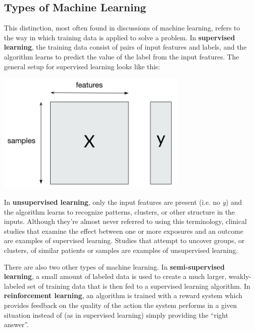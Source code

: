 \subsection{Types of Machine Learning}

This distinction, most often found in discussions of machine learning, refers to the way in which training data is applied to solve a problem. In \textbf{supervised learning}, the training data consist of pairs of input features and labels, and the algorithm learns to predict the value of the label from the input features. The general setup for supervised learning looks like this:
\begin{center}
\includegraphics[width=0.7\textwidth]{img/supervised-learning.png}
\end{center}

In \textbf{unsupervised learning}, only the input features are present (i.e. no \emph{y}) and the algorithm learns to recognize patterns, clusters, or other structure in the inputs. Although they're almost never referred to using this terminology, clinical studies that examine the effect between one or more exposures and an outcome are examples of supervised learning. Studies that attempt to uncover groups, or clusters, of similar patients or samples are examples of unsupervised learning.

There are also two other types of machine learning. In \textbf{semi-supervised learning}, a small amount of labeled data is used to create a much larger, weakly-labeled set of training data that is then fed to a supervised learning algorithm. In \textbf{reinforcement learning}, an algorithm is trained with a reward system which provides feedback on the quality of the action the system performs in a given situation instead of (as in supervised learning) simply providing the ``right answer''. 





 

